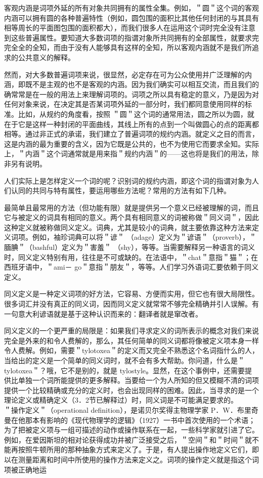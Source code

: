 客观内涵是词项外延的所有对象共同拥有的属性全集。例如，＂圆＂这个词的客观内涵可以拥有圆的各种普遍特性（例如，圆包围的面积比其他任何封闭的与其具有相等周长的平面图包围的面积都大），而我们很多人在运用这个词时完全没有注意到这些普遍属性。要知道大多数词项的指谓对象所共同拥有的全部属性，就要求完完全全的全知，而由于没有人能够具有这样的全知，所以客观内涵就不是我们所追求的公共意义的解释。

然而，对大多数普遍词项来说，很显然，必定存在可为公众使用并广泛理解的内涵，即既不是主观的也不是客观的内涵。因为我们确实可以相互交流，而且我们的确常常是在一般的用法上来理解词项的。词项之所以具有稳定的意义，乃是因为对任何对象来说，在决定其是否某词项外延的一部分时，我们都同意使用同样的标准。比如，从规约的角度看，按照 ＂圆＂这个词的通常用法，圆之所以为圆，就在于它是这样一种封闭的平面曲线，其线上所有的点到一个叫做圆心的点的距离都相等。通过非正式的承诺，我们建立了普遍词项的规约内涵。就定义之目的而言，这是内涵的最为重要的含义，因为它既是公共的，也不为使用它而要求全知。实际上，＂内涵＂这个词通常就是用来指＂规约内涵＂的——这也将是我们的用法，除非另有说明。

人们实际上是怎样定义一个词的呢？识别词的规约内涵，即这个词的指谓对象为人们认同的共同与特有属性，要运用哪些方法呢？常用的方法有如下几种。

最简单且最常用的方法（但功能有限）就是提供另一个意义已经被理解的词，而且它与被定义的词具有相同的意义。两个具有相同意义的词被称做＂同义词＂，因此这种定义就被称做同义定义。词典，尤其是较小的词典，就主要依靠这种方法来定义词项。例如，袖珍词典可以将＂谚＂ （adage）定义为＂谚语＂（proverb），＂腼腆＂（bashful）定义为＂害羞＂ （shy），等等。当需要解释另一种语言的词义时，同义定义特别有用，往往是不可或缺的。在法语中，＂chat＂意指＂猫＂；在西班牙语中，＂ami－ go＂意指＂朋友＂，等等。人们学习外语词汇要依赖于同义定义。

同义定义是一种定义词项的好方法，它容易、方便而实用，但它也有很大局限性。很多词汇并没有真正的同义词，因而同义定义就常常不够完全精确并引人误解。有一句意大利谚语就是基于这种认识而来的：翻译者就是窜改者。

同义定义的一个更严重的局限是：如果我们寻求定义的词所表示的概念对我们来说完全是外来的和令人费解的，那么，其任何简单的同义词都将像被定义项本身一样令人费解。例如，需要＂tylotoxea＂的定义而又完全不熟悉这个名词指什么的人，当给出的定义是一个简单的同义词时，就不会有多大帮助。你问道，什么是＂tylotoxea＂？哦，它不是别的，就是 tylostyle。显然，在这个事例中，还需要提供比单独一个词所能提供的更多解释。当要给一个为人所知的但又模糊不清的词项提供一个比较精确或充分的定义时，也会出现同样的困难。因此，当寻求的是一个理论定义或精确定义（3．2节已解释过）时，同义词是不可能满足要求的。\\
＂操作定义＂（operational definition），是诺贝尔奖得主物理学家 P．W．布里奇曼在他那本有影响的《现代物理学的逻辑》（1927）一书中首次使用的一个术语；为了把被定义项与一组可描述的动作或操作联系在一起，一些科学家就引进了它。例如，在爱因斯坦的相对论获得成功并被广泛接受之后，＂空间＂和＂时间＂就不能再按照牛顿所用的那种抽象方式来定义了。于是，有人提出操作地定义它们，即以在测量距离和时间中所使用的操作方法来定义之。词项的操作定义就是指这个词项被正确地运

